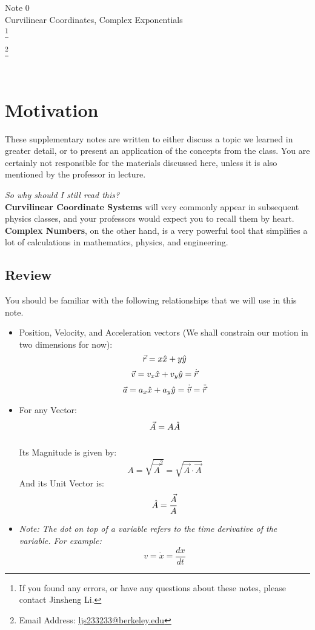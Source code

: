 \documentclass[11pt]{article}
\newcommand\blfootnote[1]{
    \begingroup
    \renewcommand\thefootnote{}\footnote{#1}
    \addtocounter{footnote}{-1}
    \endgroup
}
\theoremstyle{gangnamstyle}{\newtheorem{definition}{Definition}[]}
\theoremstyle{gangnamstyle}{\newtheorem{example}{Example}[]}
\theoremstyle{gangnamstyle}{\newtheorem{problem}{Problem}[]}
\begin{document}
\normalfont
\pagestyle{pages}


\begin{center}
\vspace{3in}
{\Large Note 0 } \\[0.05in]
Curvilinear Coordinates, Complex Exponentials  \\ 
\blfootnote{If you found any errors, or have any questions about these notes, please contact Jinsheng Li.} \blfootnote{Email Address: \href{mailto:ljs233233@berkeley.edu}{ljs233233@berkeley.edu}} \\ [-0.5in]
\end{center}

\section*{Motivation}

These supplementary notes are written to either discuss a topic we learned in greater detail, or to present an application of the concepts from the class. You are certainly not responsible for the materials discussed here, unless it is also mentioned by the professor in lecture. 

\textit{So why should I still read this?} \\
\textbf{Curvilinear Coordinate Systems} will very commonly appear in subsequent physics classes, and your professors would expect you to recall them by heart. \textbf{Complex Numbers}, on the other hand, is a very powerful tool that simplifies a lot of calculations in mathematics, physics, and engineering. 

\subsection*{Review}

You should be familiar with the following relationships that we will use in this note. 

\begin{itemize}
\item Position, Velocity, and Acceleration vectors (We shall constrain our motion in two dimensions for now): 
\[ \Vec{r} = x\Hat{x} + y\Hat{y} \]
\[ \Vec{v} = v_x\Hat{x} + v_y\Hat{y} = \Dot{\Vec{r}} \]
\[ \Vec{a} = a_x\Hat{x} + a_y\Hat{y} = \Dot{\Vec{v}} = \Ddot{\Vec{r}} \]
\item For any Vector: 
\[ \Vec{A} = A\Hat{A} \] \\
Its Magnitude is given by: 
\[ A = \sqrt{\Vec{A}^2} = \sqrt{\Vec{A} \cdot \Vec{A}} \]
And its Unit Vector is: 
\[ \Hat{A} = \frac{\Vec{A}}{A} \]
\item \textit{Note: The dot on top of a variable refers to the time derivative of the variable. For example: }
\[ v = \Dot{x} = \frac{dx}{dt} \]
\end{itemize}
\pagebreak
\end{document}
